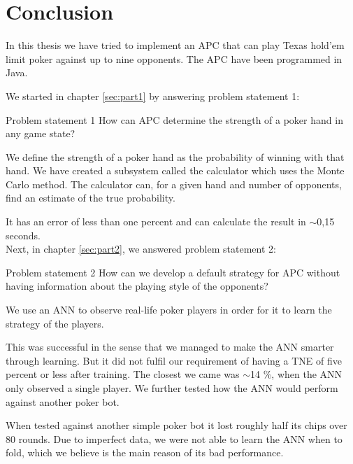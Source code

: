 \section{Conclusion}
In this thesis we have tried to implement an APC that can play Texas hold'em limit poker against up to nine opponents. The APC have been programmed in Java.

We started in chapter \ref{sec:part1} by answering problem statement 1:
\vspace{4mm}
\begin{statementBox2}{Problem statement 1}
How can APC determine the strength of a poker hand in any game state?
\end{statementBox2}
\vspace{4mm}

We define the strength of a poker hand as the probability of winning with that hand.
We have created a subsystem called the calculator which uses the Monte Carlo method. The calculator can, for a given hand and number of opponents, find an estimate of the true probability. 

It has an error of less than one percent and can calculate the result in $\sim$0,15 seconds.\\

Next, in chapter \ref{sec:part2}, we answered problem statement 2:
\vspace{4mm}
\begin{statementBox2}{Problem statement 2}
How can we develop a default strategy for APC without having information about the playing style of the opponents?
\end{statementBox2}
\vspace{4mm}

We use an ANN to observe real-life poker players in order for it to learn the strategy of the players. 

This was successful in the sense that we managed to make the ANN smarter through learning. But it did not fulfil our requirement of having a TNE of five percent or less after training. The closest we came was $\sim$14 \%, when the ANN only observed a single player. 
We further tested how the ANN would perform against another poker bot. 

When tested against another simple poker bot it lost roughly half its chips over 80 rounds. Due to imperfect data, we were not able to learn the ANN when to fold, which we believe is the main reason of its bad performance.\\

